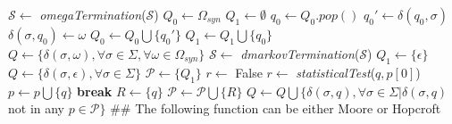 {%
%
\begin{algorithm}
  \caption{$\aleph$($\mathcal{S}, \Omega_{syn}$)\label{alg:aleph}}
    \begin{algorithmic}[1]
      \Procedure{}{}
      		\State $\mathcal{S} \gets$ \textit{omegaTermination}($\mathcal{S}$)
	      	\State $Q_0 \gets \Omega_{syn}$
	      	\State $Q_1 \gets \emptyset$
	      		\State $q_0 \gets Q_0.pop()$
	      		\For{$\sigma \in \Sigma$}
	      			\State $q_0' \gets \delta(q_0,\sigma)$
	      				\State $\delta(\sigma,q_0) \gets \omega$
	      			\Else
	      					\State $Q_0 \gets Q_0\bigcup\{q_0'\}$
	      				\EndIf 
	      			\EndIf
	      			\State $Q_1 \gets Q_1\bigcup\{q_0\}$
	      		\EndFor
	      	\EndWhile	      	
      		\State $Q \gets \{\delta(\sigma,\omega), \forall \sigma \in \Sigma, \forall \omega \in \Omega_{syn}\}$
      	\Else
      		\State $\mathcal{S} \gets$ \textit{dmarkovTermination}($\mathcal{S}$)
      		\State $Q_1 \gets \{\epsilon\}$
      		\State $Q \gets \{\delta(\sigma,\epsilon), \forall \sigma \in \Sigma\}$
      	\EndIf
      	\State $\mathcal{P} \gets \{Q_1\}$
      		\State $r \gets$ False
      			\State $r \gets$ \textit{statisticalTest}($q, p[0]$)
      				\State $p \gets p\bigcup\{q\}$
      				\State \textbf{break}
      			\EndIf
      		\EndFor
      			\State $R \gets \{q\}$
      			\State $\mathcal{P} \gets \mathcal{P}\bigcup\{R\}$
      		\EndIf 
      		\State $Q \gets Q\bigcup\{\delta(\sigma,q),\forall \sigma\in\Sigma|\delta(\sigma,q)$ not in any $p\in\mathcal{P}\}$
      	\EndFor
      	\State \#\# The following function can be either Moore or Hopcroft

\end{algorithmic}
\end{algorithm}}
